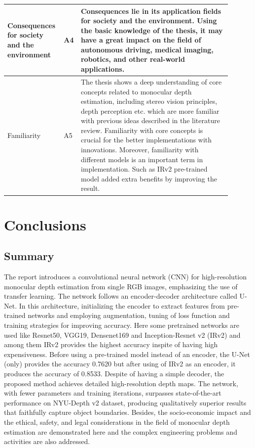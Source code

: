 \documentclass[a4paper,12pt,oneside]{book}
\begin{document}
\begin{table}[!htb]
\begin{threeparttable}
\begin{tabular}{|p{0.22\linewidth}|p{0.03\linewidth}|p{0.65\linewidth}|}
Consequences for society and the environment & A4 &

Consequences lie in its application fields for society and the environment. Using the basic knowledge of the thesis, it may have a great impact on the field of autonomous driving, medical imaging, robotics, and other real-world applications.  \\ 
\hline

Familiarity & A5 &
The thesis shows a deep understanding of core concepts related to monocular depth estimation, including stereo vision principles, depth perception etc. which are more familiar with previous ideas described in the literature review. Familiarity with core concepts is crucial for the better implementations with innovations. Moreover, familiarity with different models is an important term in implementation. Such as IRv2 pre-trained model added extra benefits by improving the result. \\ 
 \hline
\end{tabular}

\end{threeparttable}
\end{table}


\chapter{\textbf{Conclusions}}\label{chap:concl}
\section{Summary}
The report introduces a convolutional neural network (CNN) for high-resolution monocular depth estimation from single RGB images, emphasizing the use of transfer learning. The network follows an encoder-decoder architecture called U-Net. In this architecture, initializing the encoder to extract features from pre-trained networks and employing augmentation, tuning of loss function and training strategies for improving accuracy. Here some pretrained networks are used like Resnet50, VGG19, Densenet169 and Inception-Resnet v2 (IRv2) and among them IRv2 provides the highest accuracy inspite of having high expensiveness. Before using a pre-trained model instead of an encoder, the U-Net (only) provides the accuracy 0.7620 but after using of IRv2 as an encoder, it produces the accuracy of 0.8533. Despite of having a simple decoder, the proposed method achieves detailed high-resolution depth maps. The network, with fewer parameters and training iterations, surpasses state-of-the-art performance on NYU-Depth v2 dataset, producing qualitatively superior results that faithfully capture object boundaries. Besides, the socio-economic impact and the ethical, safety, and legal considerations in the field of monocular depth estimation are demonstrated here and the complex engineering problems and activities are also addressed.
\end{document}
